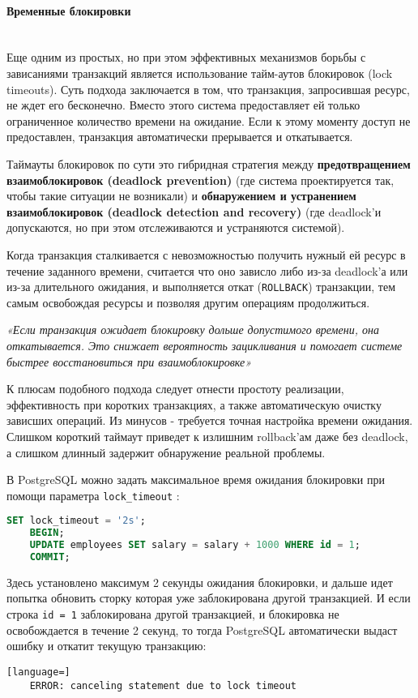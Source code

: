 \paragraph{Временные блокировки} ~\\

Еще одним из простых, но при этом эффективных механизмов борьбы с зависаниями транзакций является использование тайм-аутов блокировок (lock timeouts). Суть подхода заключается в том, что транзакция, запросившая ресурс, не ждет его бесконечно. Вместо этого система предоставляет ей только ограниченное количество времени на ожидание. Если к этому моменту доступ не предоставлен, транзакция автоматически прерывается и откатывается. \autocite[ch.18]{Silberschatz}

Таймауты блокировок по сути это гибридная стратегия между \textbf{предотвращением взаимоблокировок (deadlock prevention)} (где система проектируется так, чтобы такие ситуации не возникали) и \textbf{обнаружением и устранением взаимоблокировок (deadlock detection and recovery)} (где deadlock'и допускаются, но при этом отслеживаются и устраняются системой).

Когда транзакция сталкивается с невозможностью получить нужный ей ресурс в течение заданного времени, считается что оно зависло либо из-за deadlock'а или из-за длительного ожидания, и выполняется откат (\texttt{ROLLBACK}) транзакции, тем самым освобождая ресурсы и позволяя другим операциям продолжиться.

\begin{grayquote}
    \textit{«Если транзакция ожидает блокировку дольше допустимого времени, она откатывается. Это снижает вероятность зацикливания и помогает системе быстрее восстановиться при взаимоблокировке»} \autocite[ch.18]{Silberschatz}
\end{grayquote}

К плюсам подобного подхода следует отнести простоту реализации, эффективность при коротких транзакциях, а также автоматическую очистку зависших операций.
Из минусов - требуется точная настройка времени ожидания. Слишком короткий таймаут приведет к излишним rollback'ам даже без deadlock, а слишком длинный задержит обнаружение реальной проблемы. \autocite[ch.22]{ElmasriNavathe}

В PostgreSQL можно задать максимальное время ожидания блокировки при помощи параметра \texttt{lock\_timeout} \autocite[§19.11]{PostgreSQLdocc19}:
\begin{lstlisting}[language=SQL]
    SET lock_timeout = '2s';
    BEGIN;
    UPDATE employees SET salary = salary + 1000 WHERE id = 1;
    COMMIT;
\end{lstlisting}
Здесь установлено максимум 2 секунды ожидания блокировки, и дальше идет попытка обновить сторку которая уже заблокирована другой транзакцией. И если строка \texttt{id = 1} заблокирована другой транзакцией, и блокировка не освобождается в течение 2 секунд, то тогда PostgreSQL автоматически выдаст ошибку и откатит текущую транзакцию:
\begin{lstlisting}[language=]
    ERROR: canceling statement due to lock timeout
\end{lstlisting}

